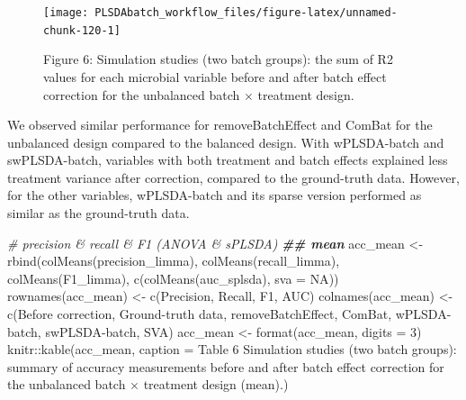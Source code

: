 \documentclass[
]{book}
\newenvironment{Shaded}{\begin{snugshade}}{\end{snugshade}}
\newcommand{\AttributeTok}[1]{\textcolor[rgb]{0.77,0.63,0.00}{#1}}
\newcommand{\CommentTok}[1]{\textcolor[rgb]{0.56,0.35,0.01}{\textit{#1}}}
\newcommand{\ConstantTok}[1]{\textcolor[rgb]{0.00,0.00,0.00}{#1}}
\newcommand{\DecValTok}[1]{\textcolor[rgb]{0.00,0.00,0.81}{#1}}
\newcommand{\DocumentationTok}[1]{\textcolor[rgb]{0.56,0.35,0.01}{\textbf{\textit{#1}}}}
\newcommand{\FunctionTok}[1]{\textcolor[rgb]{0.00,0.00,0.00}{#1}}
\newcommand{\NormalTok}[1]{#1}
\newcommand{\OtherTok}[1]{\textcolor[rgb]{0.56,0.35,0.01}{#1}}
\newcommand{\SpecialCharTok}[1]{\textcolor[rgb]{0.00,0.00,0.00}{#1}}
\newcommand{\StringTok}[1]{\textcolor[rgb]{0.31,0.60,0.02}{#1}}
\begin{document}
\begin{figure}

{\centering \texttt{[image: PLSDAbatch\_workflow\_files/figure-latex/unnamed-chunk-120-1]} 

}

\caption{Figure 6: Simulation studies (two batch groups): the sum of R2 values for each microbial variable before and after batch effect correction for the unbalanced batch × treatment design.}\label{fig:unnamed-chunk-120}
\end{figure}

We observed similar performance for removeBatchEffect and ComBat for the unbalanced design compared to the balanced design. With wPLSDA-batch and swPLSDA-batch, variables with both treatment and batch effects explained less treatment variance after correction, compared to the ground-truth data. However, for the other variables, wPLSDA-batch and its sparse version performed as similar as the ground-truth data.

\begin{Shaded}
\begin{Highlighting}[]
\CommentTok{\# precision \& recall \& F1 (ANOVA \& sPLSDA)}
\DocumentationTok{\#\# mean}
\NormalTok{acc\_mean }\OtherTok{\textless{}{-}} \FunctionTok{rbind}\NormalTok{(}\FunctionTok{colMeans}\NormalTok{(precision\_limma), }\FunctionTok{colMeans}\NormalTok{(recall\_limma), }
                  \FunctionTok{colMeans}\NormalTok{(F1\_limma), }\FunctionTok{c}\NormalTok{(}\FunctionTok{colMeans}\NormalTok{(auc\_splsda), }\AttributeTok{sva =} \ConstantTok{NA}\NormalTok{))}
\FunctionTok{rownames}\NormalTok{(acc\_mean) }\OtherTok{\textless{}{-}} \FunctionTok{c}\NormalTok{(}\StringTok{\textquotesingle{}Precision\textquotesingle{}}\NormalTok{, }\StringTok{\textquotesingle{}Recall\textquotesingle{}}\NormalTok{, }\StringTok{\textquotesingle{}F1\textquotesingle{}}\NormalTok{, }\StringTok{\textquotesingle{}AUC\textquotesingle{}}\NormalTok{)}
\FunctionTok{colnames}\NormalTok{(acc\_mean) }\OtherTok{\textless{}{-}} \FunctionTok{c}\NormalTok{(}\StringTok{\textquotesingle{}Before correction\textquotesingle{}}\NormalTok{, }\StringTok{\textquotesingle{}Ground{-}truth data\textquotesingle{}}\NormalTok{, }
                        \StringTok{\textquotesingle{}removeBatchEffect\textquotesingle{}}\NormalTok{, }\StringTok{\textquotesingle{}ComBat\textquotesingle{}}\NormalTok{, }
                        \StringTok{\textquotesingle{}wPLSDA{-}batch\textquotesingle{}}\NormalTok{, }\StringTok{\textquotesingle{}swPLSDA{-}batch\textquotesingle{}}\NormalTok{, }\StringTok{\textquotesingle{}SVA\textquotesingle{}}\NormalTok{)}
\NormalTok{acc\_mean }\OtherTok{\textless{}{-}} \FunctionTok{format}\NormalTok{(acc\_mean, }\AttributeTok{digits =} \DecValTok{3}\NormalTok{)}
\NormalTok{knitr}\SpecialCharTok{::}\FunctionTok{kable}\NormalTok{(acc\_mean, }\AttributeTok{caption =} \StringTok{\textquotesingle{}Table 6 Simulation studies (two batch groups): summary of accuracy measurements before and after batch effect correction for the unbalanced batch × treatment design (mean).\textquotesingle{}}\NormalTok{)}
\end{Highlighting}
\end{Shaded}
\end{document}
